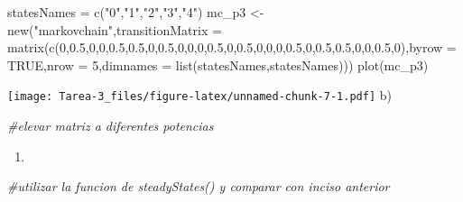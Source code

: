 \documentclass[
]{article}
\newenvironment{Shaded}{\begin{snugshade}}{\end{snugshade}}
\newcommand{\AttributeTok}[1]{\textcolor[rgb]{0.77,0.63,0.00}{#1}}
\newcommand{\CommentTok}[1]{\textcolor[rgb]{0.56,0.35,0.01}{\textit{#1}}}
\newcommand{\ConstantTok}[1]{\textcolor[rgb]{0.00,0.00,0.00}{#1}}
\newcommand{\DecValTok}[1]{\textcolor[rgb]{0.00,0.00,0.81}{#1}}
\newcommand{\FloatTok}[1]{\textcolor[rgb]{0.00,0.00,0.81}{#1}}
\newcommand{\FunctionTok}[1]{\textcolor[rgb]{0.00,0.00,0.00}{#1}}
\newcommand{\NormalTok}[1]{#1}
\newcommand{\OtherTok}[1]{\textcolor[rgb]{0.56,0.35,0.01}{#1}}
\newcommand{\StringTok}[1]{\textcolor[rgb]{0.31,0.60,0.02}{#1}}
\providecommand{\tightlist}{%
  \setlength{\itemsep}{0pt}\setlength{\parskip}{0pt}}
\begin{document}
\begin{Shaded}
\begin{Highlighting}[]
\NormalTok{statesNames }\OtherTok{=} \FunctionTok{c}\NormalTok{(}\StringTok{"0"}\NormalTok{,}\StringTok{"1"}\NormalTok{,}\StringTok{"2"}\NormalTok{,}\StringTok{"3"}\NormalTok{,}\StringTok{"4"}\NormalTok{)}
\NormalTok{mc\_p3 }\OtherTok{\textless{}{-}} \FunctionTok{new}\NormalTok{(}\StringTok{"markovchain"}\NormalTok{,}\AttributeTok{transitionMatrix =} \FunctionTok{matrix}\NormalTok{(}\FunctionTok{c}\NormalTok{(}\DecValTok{0}\NormalTok{,}\FloatTok{0.5}\NormalTok{,}\DecValTok{0}\NormalTok{,}\DecValTok{0}\NormalTok{,}\FloatTok{0.5}\NormalTok{,}\FloatTok{0.5}\NormalTok{,}\DecValTok{0}\NormalTok{,}\FloatTok{0.5}\NormalTok{,}\DecValTok{0}\NormalTok{,}\DecValTok{0}\NormalTok{,}\DecValTok{0}\NormalTok{,}\FloatTok{0.5}\NormalTok{,}\DecValTok{0}\NormalTok{,}\FloatTok{0.5}\NormalTok{,}\DecValTok{0}\NormalTok{,}\DecValTok{0}\NormalTok{,}\DecValTok{0}\NormalTok{,}\FloatTok{0.5}\NormalTok{,}\DecValTok{0}\NormalTok{,}\FloatTok{0.5}\NormalTok{,}\FloatTok{0.5}\NormalTok{,}\DecValTok{0}\NormalTok{,}\DecValTok{0}\NormalTok{,}\FloatTok{0.5}\NormalTok{,}\DecValTok{0}\NormalTok{),}\AttributeTok{byrow =} \ConstantTok{TRUE}\NormalTok{,}\AttributeTok{nrow =} \DecValTok{5}\NormalTok{,}\AttributeTok{dimnames =} \FunctionTok{list}\NormalTok{(statesNames,statesNames)))}
\FunctionTok{plot}\NormalTok{(mc\_p3)}
\end{Highlighting}
\end{Shaded}

\texttt{[image: Tarea-3\_files/figure-latex/unnamed-chunk-7-1.pdf]} b)

\begin{Shaded}
\begin{Highlighting}[]
\CommentTok{\#elevar matriz a diferentes potencias}
\end{Highlighting}
\end{Shaded}

\begin{enumerate}
\def\labelenumi{\alph{enumi})}
\setcounter{enumi}{2}
\tightlist
\item
\end{enumerate}

\begin{Shaded}
\begin{Highlighting}[]
\CommentTok{\#utilizar la funcion de steadyStates() y comparar con inciso anterior}
\end{Highlighting}
\end{Shaded}
\end{document}
